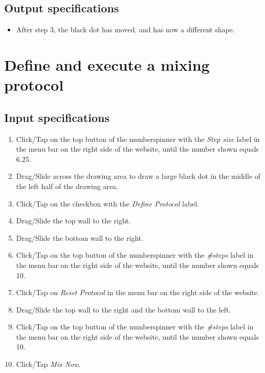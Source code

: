\subsection*{Output specifications}
\begin{itemize}
\item After step 3, the black dot has moved, and has now a different shape.
\end{itemize}

\section{Define and execute a mixing protocol}

\subsection*{Input specifications}
\begin{enumerate}
\item Click/Tap on the top button of the numberspinner with the \emph{Step size} label in the menu bar on the right side of the website, until the number shown equals 6.25.
\item Drag/Slide across the drawing area to draw a large black dot in the middle of the left half of the drawing area.
\item Click/Tap on the checkbox with the \emph{Define Protocol} label.
\item Drag/Slide the top wall to the right.
\item Drag/Slide the bottom wall to the right.
\item Click/Tap on the top button of the numberspinner with the \emph{\#steps} label in the menu bar on the right side of the website, until the number shown equals 10.
\item Click/Tap on \emph{Reset Protocol} in the menu bar on the right side of the website.
\item Drag/Slide the top wall to the right and the bottom wall to the left.
\item Click/Tap on the top button of the numberspinner with the \emph{\#steps} label in the menu bar on the right side of the website, until the number shown equals 10.
\item Click/Tap \emph{Mix Now}.
\end{enumerate}

